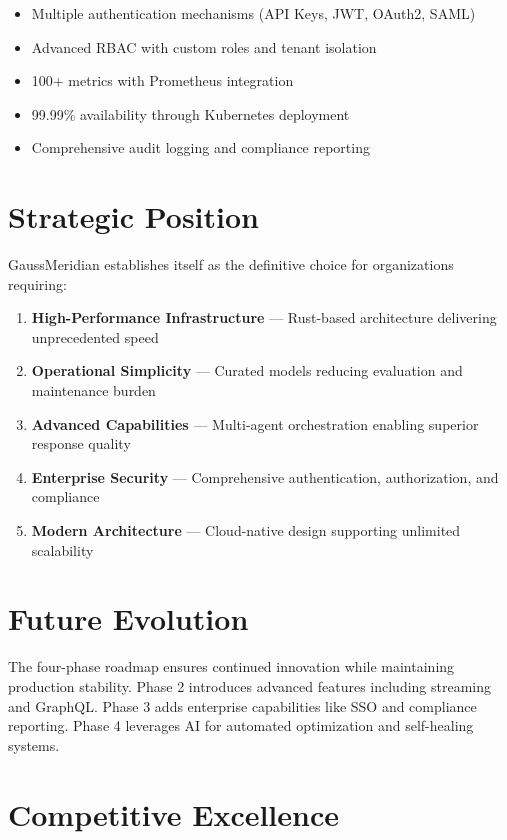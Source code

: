 \documentclass[12pt,a4paper,twoside]{report}
\begin{document}
\begin{itemize}[leftmargin=*]
    \item Multiple authentication mechanisms (API Keys, JWT, OAuth2, SAML)
    \item Advanced RBAC with custom roles and tenant isolation
    \item 100+ metrics with Prometheus integration
    \item 99.99\% availability through Kubernetes deployment
    \item Comprehensive audit logging and compliance reporting
\end{itemize}

\section*{Strategic Position}

GaussMeridian establishes itself as the definitive choice for organizations requiring:

\begin{enumerate}
    \item \textbf{High-Performance Infrastructure} — Rust-based architecture delivering unprecedented speed
    \item \textbf{Operational Simplicity} — Curated models reducing evaluation and maintenance burden
    \item \textbf{Advanced Capabilities} — Multi-agent orchestration enabling superior response quality
    \item \textbf{Enterprise Security} — Comprehensive authentication, authorization, and compliance
    \item \textbf{Modern Architecture} — Cloud-native design supporting unlimited scalability
\end{enumerate}

\section*{Future Evolution}

The four-phase roadmap ensures continued innovation while maintaining production stability. Phase 2 introduces advanced features including streaming and GraphQL. Phase 3 adds enterprise capabilities like SSO and compliance reporting. Phase 4 leverages AI for automated optimization and self-healing systems.

\section*{Competitive Excellence}
\end{document}
